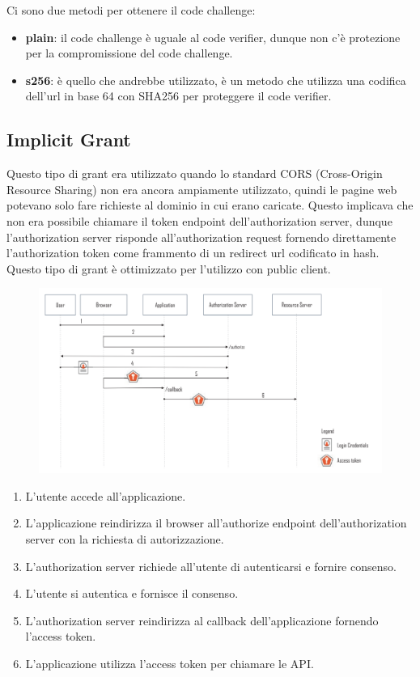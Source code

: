 Ci sono due metodi per ottenere il code challenge:

\begin{itemize}
      \item \textbf{plain}: il code challenge è uguale al code verifier, dunque non c'è
            protezione per la compromissione del code challenge.
      \item \textbf{s256}: è quello che andrebbe utilizzato, è un metodo che utilizza
            una codifica dell'url in base 64 con SHA256 per proteggere il code verifier.
\end{itemize}

\subsection{Implicit Grant}

Questo tipo di grant era utilizzato quando lo standard CORS (Cross-Origin Resource
Sharing) non era ancora ampiamente utilizzato, quindi le pagine web potevano solo
fare richieste al dominio in cui erano caricate. Questo implicava che non era possibile
chiamare il token endpoint dell'authorization server, dunque l'authorization server
risponde all'authorization request fornendo direttamente l'authorization token come
frammento di un redirect url codificato in hash.
Questo tipo di grant è ottimizzato per l'utilizzo con public client.

\begin{figure}[H]
      \centering
      \includegraphics[width=\textwidth, keepaspectratio]{capitoli/id_managing/imgs/implicitgrant.png}
\end{figure}

\begin{enumerate}
      \item L'utente accede all'applicazione.
      \item L'applicazione reindirizza il browser all'authorize endpoint
            dell'authorization server con la richiesta di autorizzazione.
      \item L'authorization server richiede all'utente di autenticarsi e fornire consenso.
      \item L'utente si autentica e fornisce il consenso.
      \item L'authorization server reindirizza al callback dell'applicazione fornendo
            l'access token.
      \item L'applicazione utilizza l'access token per chiamare le API.
\end{enumerate}

